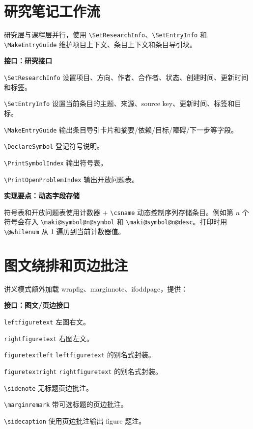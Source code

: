 \documentclass[a4paper,11pt]{ltxdoc}
\newcommand{\mpkg}[1]{\textsf{#1}}
\newcommand{\menv}[1]{\texttt{#1}}
\newcommand{\mcmd}[1]{\texttt{\textbackslash#1}}
\newenvironment{implementation}[1]
  {\par\medskip\noindent\textbf{\color{MakiBlue}实现要点：#1}\par\smallskip}
  {\par\medskip}
\newenvironment{interfaceblock}[1]
  {\par\medskip\noindent\textbf{\color{MakiBlue}接口：#1}\par\smallskip\begin{description}[leftmargin=3.2cm,style=nextline]}
  {\end{description}\par\medskip}
\begin{document}
\section{研究笔记工作流}

研究层与课程层并行，使用 \mcmd{SetResearchInfo}、\mcmd{SetEntryInfo} 和
\mcmd{MakeEntryGuide} 维护项目上下文、条目上下文和条目导引块。

\begin{interfaceblock}{研究接口}
\item[\mcmd{SetResearchInfo}] 设置项目、方向、作者、合作者、状态、创建时间、更新时间和标签。
\item[\mcmd{SetEntryInfo}] 设置当前条目的主题、来源、source key、更新时间、标签和目标。
\item[\mcmd{MakeEntryGuide}] 输出条目导引卡片和摘要/依赖/目标/障碍/下一步等字段。
\item[\mcmd{DeclareSymbol}] 登记符号说明。
\item[\mcmd{PrintSymbolIndex}] 输出符号表。
\item[\mcmd{PrintOpenProblemIndex}] 输出开放问题表。
\end{interfaceblock}

\begin{implementation}{动态字段存储}
符号表和开放问题表使用计数器 + \mcmd{csname} 动态控制序列存储条目。例如第 \(n\) 个符号会存入
\verb|\maki@symbol@n@symbol| 和 \verb|\maki@symbol@n@desc|。打印时用 \mcmd{@whilenum}
从 1 遍历到当前计数器值。
\end{implementation}

\section{图文绕排和页边批注}

讲义模式额外加载 \mpkg{wrapfig}、\mpkg{marginnote}、\mpkg{ifoddpage}，提供：

\begin{interfaceblock}{图文/页边接口}
\item[\menv{leftfiguretext}] 左图右文。
\item[\menv{rightfiguretext}] 右图左文。
\item[\menv{figuretextleft}] \menv{leftfiguretext} 的别名式封装。
\item[\menv{figuretextright}] \menv{rightfiguretext} 的别名式封装。
\item[\mcmd{sidenote}] 无标题页边批注。
\item[\mcmd{marginremark}] 带可选标题的页边批注。
\item[\mcmd{sidecaption}] 使用页边批注输出 figure 题注。
\end{interfaceblock}
\end{document}
